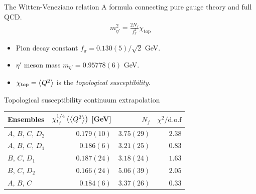 \documentclass[10pt,show notes on second screen]{beamer}
\begin{document}
\begin{frame}{The Witten-Veneziano relation}
A formula connecting pure gauge theory and full QCD.
\begin{align}
    m_{\eta'}^2 = \frac{2N_f}{f^2_\pi}\chi_\mathrm{top}
\end{align}
\begin{itemize}
    \item Pion decay constant $f_\pi=0.130(5)/\sqrt{2}$ GeV.
    \item $\eta'$ meson mass $m_{\eta'}=0.95778(6)$ GeV.
    \item $\chi_\mathrm{top}=\left\langle{Q^2}\right\rangle$ is the \textit{topological susceptibility}.
\end{itemize}
\end{frame}

\begin{frame}{Topological susceptibility continuum extrapolation}
\begin{table}
    \centering
    \begin{tabular}{l r r r}
        \toprule
        Ensembles               & $\chi_{t_f}^{1/4}\left( \left\langle{Q^2}\right\rangle \right)$ [GeV]   & $N_f$         & $\chi^2/\mathrm{d.o.f}$ \\ \midrule
        $A$, $B$, $C$, $D_2$    & $0.179(10)$                                           & $3.75(29)$    & $2.38$ \\
        $A$, $B$, $C$, $D_1$    & $0.186(6)$                                            & $3.21(25)$    & $0.83$ \\
        $B$, $C$, $D_1$         & $0.187(24)$                                           & $3.18(24)$    & $1.63$ \\ 
        $B$, $C$, $D_2$         & $0.166(24)$                                           & $5.06(39)$    & $2.05$ \\ 
        $A$, $B$, $C$           & $0.184(6)$                                            & $3.37(26)$    & $0.33$ \\
        \bottomrule
    \end{tabular}
\end{table}
\end{frame}
\end{document}
